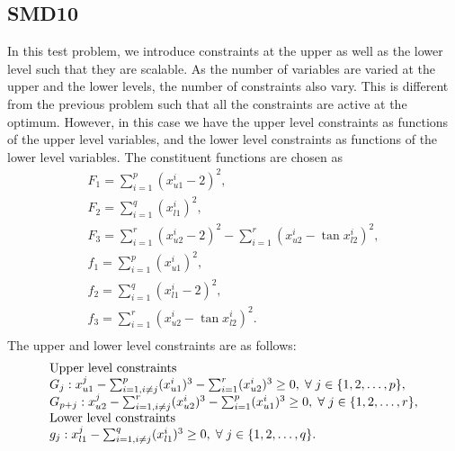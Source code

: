 \documentclass[twoside]{article}
\begin{document}
\subsection{SMD10}
In this test problem, we introduce constraints at the upper as well as the lower level such that they are scalable. As the number of variables are varied at the upper and the lower levels, the number of constraints also vary. This is different from the previous problem such that all the constraints are active at the optimum. However, in this case we have the upper level constraints as functions of the upper level variables, and the lower level constraints as functions of the lower level variables. The constituent functions are chosen as
\begin{equation}
\begin{array}{l}
F_1 = \sum_{i=1}^{p} (x_{u1}^{i} - 2)^2,\\
F_2 = \sum_{i=1}^{q} (x_{l1}^{i})^2,\\
F_3 = \sum_{i=1}^{r} (x_{u2}^{i} - 2)^2 - \sum_{i=1}^{r} (x_{u2}^{i} - \tan x_{l2}^{i})^2,\\
f_1 = \sum_{i=1}^{p} (x_{u1}^{i})^2,\\
f_2 = \sum_{i=1}^{q} (x_{l1}^{i} - 2)^2,\\
f_3 = \sum_{i=1}^{r} (x_{u2}^{i} - \tan x_{l2}^{i})^2.\\
\end{array}
\end{equation}
The upper and lower level constraints are as follows:
\begin{equation}
\begin{array}{l}
\mbox{Upper level constraints}\\
G_j: x_{u1}^{j} - \sum_{i=1,i \ne j}^{p} (x_{u1}^{i})^3 - \sum_{i=1}^{r} (x_{u2}^{i})^3  \ge 0, \hspace{1mm} \forall \hspace{1mm} j \in \{1,2,\ldots,p\},\\
G_{p+j}: x_{u2}^{j} - \sum_{i=1,i \ne j}^{r} (x_{u2}^{i})^3 - \sum_{i=1}^{p} (x_{u1}^{i})^3  \ge 0, \hspace{1mm} \forall \hspace{1mm} j \in \{1,2,\ldots,r\},\\
\mbox{Lower level constraints}\\
g_j: x_{l1}^{j} - \sum_{i=1,i \ne j}^{q} (x_{l1}^{i})^3  \ge 0, \hspace{1mm} \forall \hspace{1mm} j \in \{1,2,\ldots,q\}.\\
\end{array}
\end{equation}
\end{document}
